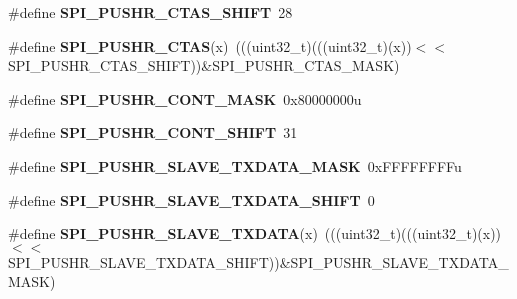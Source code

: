 \begin{DoxyCompactItemize}
\item 
\#define {\bfseries S\+P\+I\+\_\+\+P\+U\+S\+H\+R\+\_\+\+C\+T\+A\+S\+\_\+\+S\+H\+I\+FT}~28\hypertarget{group__SPI__Register__Masks_ga16a0810e65793ba9f24a5ae8be8cf49a}{}\label{group__SPI__Register__Masks_ga16a0810e65793ba9f24a5ae8be8cf49a}

\item 
\#define {\bfseries S\+P\+I\+\_\+\+P\+U\+S\+H\+R\+\_\+\+C\+T\+AS}(x)~(((uint32\+\_\+t)(((uint32\+\_\+t)(x))$<$$<$S\+P\+I\+\_\+\+P\+U\+S\+H\+R\+\_\+\+C\+T\+A\+S\+\_\+\+S\+H\+I\+FT))\&S\+P\+I\+\_\+\+P\+U\+S\+H\+R\+\_\+\+C\+T\+A\+S\+\_\+\+M\+A\+SK)\hypertarget{group__SPI__Register__Masks_gadc43fdbca4e34579e7ede4ac104c7ae5}{}\label{group__SPI__Register__Masks_gadc43fdbca4e34579e7ede4ac104c7ae5}

\item 
\#define {\bfseries S\+P\+I\+\_\+\+P\+U\+S\+H\+R\+\_\+\+C\+O\+N\+T\+\_\+\+M\+A\+SK}~0x80000000u\hypertarget{group__SPI__Register__Masks_gac28b0accd475a1a991ccece8d1333ae0}{}\label{group__SPI__Register__Masks_gac28b0accd475a1a991ccece8d1333ae0}

\item 
\#define {\bfseries S\+P\+I\+\_\+\+P\+U\+S\+H\+R\+\_\+\+C\+O\+N\+T\+\_\+\+S\+H\+I\+FT}~31\hypertarget{group__SPI__Register__Masks_gab114a13d8478311e8b77778d4cbd5d96}{}\label{group__SPI__Register__Masks_gab114a13d8478311e8b77778d4cbd5d96}

\item 
\#define {\bfseries S\+P\+I\+\_\+\+P\+U\+S\+H\+R\+\_\+\+S\+L\+A\+V\+E\+\_\+\+T\+X\+D\+A\+T\+A\+\_\+\+M\+A\+SK}~0x\+F\+F\+F\+F\+F\+F\+F\+Fu\hypertarget{group__SPI__Register__Masks_ga70296421b5faddc6c9fbbb984685b5a0}{}\label{group__SPI__Register__Masks_ga70296421b5faddc6c9fbbb984685b5a0}

\item 
\#define {\bfseries S\+P\+I\+\_\+\+P\+U\+S\+H\+R\+\_\+\+S\+L\+A\+V\+E\+\_\+\+T\+X\+D\+A\+T\+A\+\_\+\+S\+H\+I\+FT}~0\hypertarget{group__SPI__Register__Masks_gaa965b8c34dc45034184a2cad39a0b825}{}\label{group__SPI__Register__Masks_gaa965b8c34dc45034184a2cad39a0b825}

\item 
\#define {\bfseries S\+P\+I\+\_\+\+P\+U\+S\+H\+R\+\_\+\+S\+L\+A\+V\+E\+\_\+\+T\+X\+D\+A\+TA}(x)~(((uint32\+\_\+t)(((uint32\+\_\+t)(x))$<$$<$S\+P\+I\+\_\+\+P\+U\+S\+H\+R\+\_\+\+S\+L\+A\+V\+E\+\_\+\+T\+X\+D\+A\+T\+A\+\_\+\+S\+H\+I\+FT))\&S\+P\+I\+\_\+\+P\+U\+S\+H\+R\+\_\+\+S\+L\+A\+V\+E\+\_\+\+T\+X\+D\+A\+T\+A\+\_\+\+M\+A\+SK)\hypertarget{group__SPI__Register__Masks_ga5833d343153e57cb3493f85b0342989e}{}\label{group__SPI__Register__Masks_ga5833d343153e57cb3493f85b0342989e}


\end{DoxyCompactItemize}

